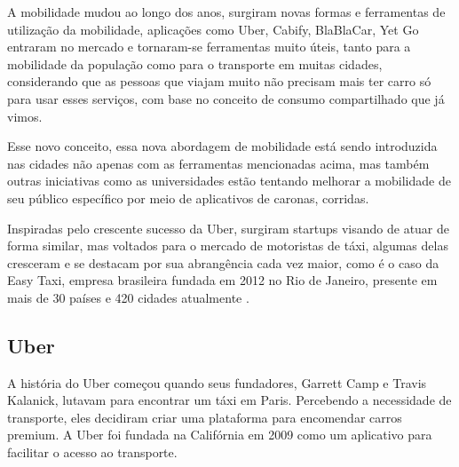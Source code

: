 A mobilidade mudou ao longo dos anos, surgiram novas formas e ferramentas de utilização da mobilidade, aplicações como Uber, Cabify, BlaBlaCar, Yet Go entraram no mercado e tornaram-se ferramentas muito úteis, tanto para a mobilidade da população como para o transporte em muitas cidades, considerando que as pessoas que viajam muito não precisam mais ter carro só para usar esses serviços, com base no conceito de consumo compartilhado que já vimos.

Esse novo conceito, essa nova abordagem de mobilidade está sendo introduzida nas cidades não apenas com as ferramentas mencionadas acima, mas também outras iniciativas como as universidades estão tentando melhorar a mobilidade de seu público específico por meio de aplicativos de caronas, corridas.

Inspiradas pelo crescente sucesso da Uber, surgiram startups visando de atuar de forma similar, mas voltados para o mercado de motoristas de táxi, algumas delas cresceram e se destacam por sua abrangência cada vez maior, como é o caso da Easy Taxi, empresa brasileira fundada em 2012 no Rio de Janeiro, presente em mais de 30 países e 420 cidades atualmente \cite{caronae}.

\subsection{Uber}
A história do Uber começou quando seus fundadores, Garrett Camp e Travis Kalanick, lutavam para encontrar um táxi em Paris. Percebendo a necessidade de transporte, eles decidiram criar uma plataforma para encomendar carros premium. A Uber foi fundada na Califórnia em 2009 como um aplicativo para facilitar o acesso ao transporte. 

